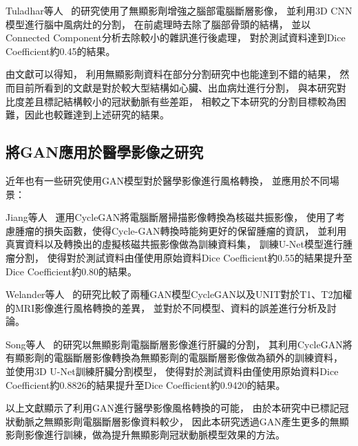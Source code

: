 \documentclass[class=NCU_thesis, crop=false]{standalone}
\begin{document}
Tuladhar等人~\cite{tuladharAutomaticSegmentationStroke2020}
的研究使用了無顯影劑增強之腦部電腦斷層影像，
並利用3D CNN模型進行腦中風病灶的分割，
在前處理時去除了腦部骨頭的結構，
並以Connected Component分析去除較小的雜訊進行後處理，
對於測試資料達到Dice Coefficient約0.45的結果。

由文獻可以得知，
利用無顯影劑資料在部分分割研究中也能達到不錯的結果，
然而目前所看到的文獻是對於較大型結構如心臟、出血病灶進行分割，
與本研究對比度差且標記結構較小的冠狀動脈有些差距，
相較之下本研究的分割目標較為困難，因此也較難達到上述研究的結果。

\subsection{將GAN應用於醫學影像之研究}
近年也有一些研究使用GAN模型對於醫學影像進行風格轉換，
並應用於不同場景：

Jiang等人~\cite{jiangTumorAwareAdversarialDomain2018}
運用CycleGAN將電腦斷層掃描影像轉換為核磁共振影像，
使用了考慮腫瘤的損失函數，使得Cycle-GAN轉換時能夠更好的保留腫瘤的資訊，
並利用真實資料以及轉換出的虛擬核磁共振影像做為訓練資料集，
訓練U-Net模型進行腫瘤分割，
使得對於測試資料由僅使用原始資料Dice Coefficient約0.55的結果提升至Dice Coefficient約0.80的結果。

Welander等人~\cite{welanderGenerativeAdversarialNetworks2018}
的研究比較了兩種GAN模型CycleGAN以及UNIT對於T1、T2加權的MRI影像進行風格轉換的差異，
並對於不同模型、資料的誤差進行分析及討論。

Song等人~\cite{songNoncontrastCTLiver2020}
的研究以無顯影劑電腦斷層影像進行肝臟的分割，
其利用CycleGAN將有顯影劑的電腦斷層影像轉換為無顯影劑的電腦斷層影像做為額外的訓練資料，
並使用3D U-Net訓練肝臟分割模型，
使得對於測試資料由僅使用原始資料Dice Coefficient約0.8826的結果提升至Dice Coefficient約0.9420的結果。

以上文獻顯示了利用GAN進行醫學影像風格轉換的可能，
由於本研究中已標記冠狀動脈之無顯影劑電腦斷層影像資料較少，
因此本研究透過GAN產生更多的無顯影劑影像進行訓練，做為提升無顯影劑冠狀動脈模型效果的方法。
\end{document}
